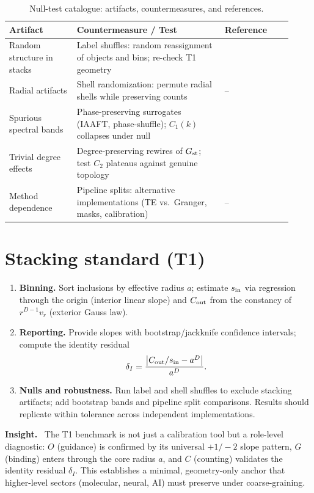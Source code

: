 \documentclass[12pt,a4paper,oneside]{scrreprt}
\newenvironment{insight}{\par\vspace{0.5em}\noindent\textbf{Insight.}\ }{\par\vspace{0.5em}}
\begin{document}
\begin{table}[htbp]\centering
\caption{Null-test catalogue: artifacts, countermeasures, and references.}
\begin{tabular}{p{0.22\linewidth}p{0.48\linewidth}p{0.22\linewidth}}
\toprule
\textbf{Artifact} & \textbf{Countermeasure / Test} & \textbf{Reference} \\ \midrule
Random structure in stacks & Label shuffles: random reassignment of objects and bins; re-check T1 geometry & \cite{Theiler1992} \\
Radial artifacts & Shell randomization: permute radial shells while preserving counts & – \\
Spurious spectral bands & Phase-preserving surrogates (IAAFT, phase-shuffle); $C_1(k)$ collapses under null & \cite{Schreiber2000,Prichard1994} \\
Trivial degree effects & Degree-preserving rewires of $G_{\rm st}$; test $C_2$ plateaus against genuine topology & \cite{Maslov2002,Newman2010} \\
Method dependence & Pipeline splits: alternative implementations (TE vs.\ Granger, masks, calibration) & – \\ 
\bottomrule
\end{tabular}
\end{table}

\section*{Stacking standard (T1)}

\begin{enumerate}
\item \textbf{Binning.} Sort inclusions by effective radius $a$; estimate $s_{\rm in}$ via regression through the origin (interior linear slope) and $C_{\rm out}$ from the constancy of $r^{D-1}v_r$ (exterior Gauss law).
\item \textbf{Reporting.} Provide slopes with bootstrap/jackknife confidence intervals; compute the identity residual
\[
\delta_I=\frac{\big|C_{\rm out}/s_{\rm in}-a^D\big|}{a^D}.
\]
\item \textbf{Nulls and robustness.} Run label and shell shuffles to exclude stacking artifacts; add bootstrap bands and pipeline split comparisons. Results should replicate within tolerance across independent implementations.
\end{enumerate}

\begin{insight}
The T1 benchmark is not just a calibration tool but a role-level diagnostic:  
$O$ (guidance) is confirmed by its universal $+1/-2$ slope pattern,  
$G$ (binding) enters through the core radius $a$, and  
$C$ (counting) validates the identity residual $\delta_I$.  
This establishes a minimal, geometry-only anchor that higher-level sectors (molecular, neural, AI) must preserve under coarse-graining.
\end{insight}
\end{document}

